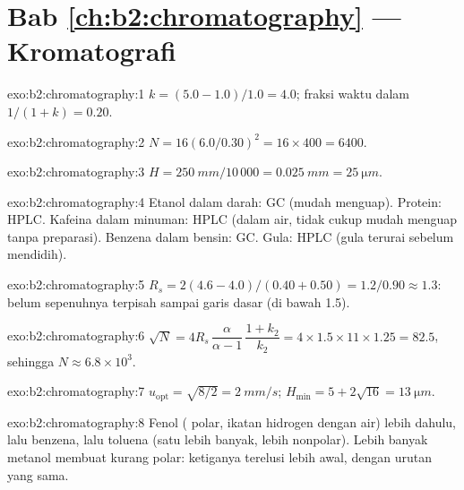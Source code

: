\section*{Bab \ref{ch:b2:chromatography} --- Kromatografi}

\begin{solution}{exo:b2:chromatography:1}
$k = (5.0 - 1.0)/1.0 = 4.0$; fraksi waktu dalam  $1/(1 + k) = 0.20$.
\end{solution}

\begin{solution}{exo:b2:chromatography:2}
$N = 16(6.0/0.30)^2 = 16 \times 400 = 6400$.
\end{solution}

\begin{solution}{exo:b2:chromatography:3}
$H = \qty{250}{mm}/10\,000 = \qty{0.025}{mm} = \qty{25}{\micro m}$.
\end{solution}

\begin{solution}{exo:b2:chromatography:4}
Etanol dalam darah: GC (mudah menguap). Protein: HPLC. Kafeina dalam
minuman: HPLC (dalam air, tidak cukup mudah menguap tanpa preparasi).
Benzena dalam bensin: GC. Gula: HPLC (gula terurai sebelum mendidih).
\end{solution}

\begin{solution}{exo:b2:chromatography:5}
$R_s = 2(4.6 - 4.0)/(0.40 + 0.50) = 1.2/0.90 \approx 1.3$: belum sepenuhnya terpisah sampai garis dasar (di bawah 1.5).
\end{solution}

\begin{solution}{exo:b2:chromatography:6}
$\sqrt N = 4R_s\,\dfrac{\alpha}{\alpha - 1}\,\dfrac{1 + k_2}{k_2} = 4 \times 1.5 \times 11 \times 1.25 =
82.5$, sehingga $N \approx 6.8 \times 10^3$.
\end{solution}

\begin{solution}{exo:b2:chromatography:7}
$u_{\mathrm{opt}} = \sqrt{8/2} = \qty{2}{mm/s}$; $H_{\min} = 5 + 2\sqrt{16} = \qty{13}{\micro m}$.
\end{solution}

\begin{solution}{exo:b2:chromatography:8}
Fenol ( polar, ikatan hidrogen dengan air) lebih dahulu, lalu
benzena, lalu toluena (satu  lebih banyak, lebih nonpolar). Lebih
banyak metanol membuat  kurang polar: ketiganya terelusi lebih
awal, dengan urutan yang sama.
\end{solution}

